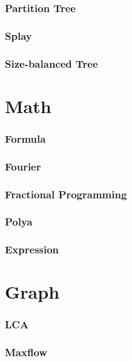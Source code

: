 \documentclass[a4paper, twocolumn, landscape]{article}
\begin{document}
\section{Partition Tree}

\section{Splay}

\section{Size-balanced Tree}


\part{Math}
\section{Formula}

\section{Fourier}

\section{Fractional Programming}

\section{Polya}

\section{Expression}


\part{Graph}
\section{LCA}

\section{Maxflow}


\end{document}
